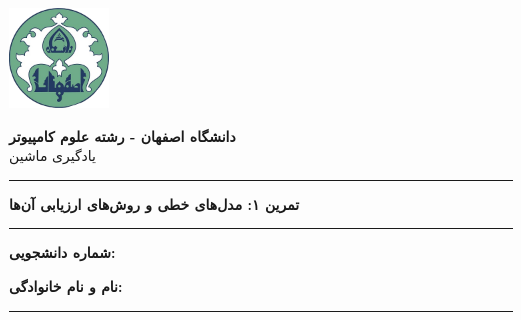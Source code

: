 \begin{center}
	\includegraphics[width=75pt, height=75pt]{./images/isf_uni_logo.png}
\end{center}

\begin{center}
	\begin{minipage}{\textwidth}
		\begin{center}
			\textbf{\Large دانشگاه اصفهان - رشته علوم کامپیوتر \\}
			\Large {یادگیری ماشین}
		\end{center}
		\hrule
		\begin{center}
			\textbf{\huge {تمرین ۱: مدل‌های خطی و روش‌های ارزیابی آن‌ها }}
		\end{center}
		\hrule
	\end{minipage}
\end{center}

\begin{flushright}
	\textbf{\large شماره دانشجویی:}
\end{flushright}
\begin{flushright}
	\textbf{\large نام و نام خانوادگی:}
\end{flushright}
\hrule
\vspace{\baselineskip}
\vspace{\baselineskip}